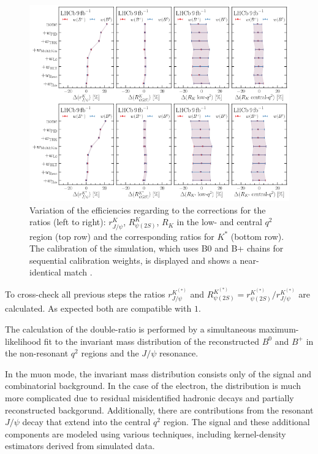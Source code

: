 \begin{figure}
    \centering
    \includegraphics[width=\linewidth]{figures/weights.png}
    \caption{Variation of the efficiencies regarding to the corrections for the ratios (left to right):
    $r^{K}_{J\!/\!\psi}$, $R^{K}_{\psi(2S)}$, $R_{K}$ in the low- and central $q^2$ region (top row) 
    and the corresponding ratios for $K^*$ (bottom row). The calibration of the simulation, which uses 
    B0 and B+ chains for sequential calibration weights, is displayed and shows a near-identical match 
    \cite{lhcbcollaboration2022test}.}
    \label{fig:weights}
\end{figure}
To cross-check all previous steps the ratios $r^{K^{(*)}}_{J\!/\!\psi}$ and 
${R^{K^{(*)}}_{\psi(2S)}=r^{K^{(*)}}_{\psi(2S)}/r^{K^{(*)}}_{J\!/\!\psi}}$ 
are calculated. As expected both are compatible with $\num{1}$.

The calculation of the double-ratio is performed by a simultaneous maximum-likelihood 
fit to the invariant mass distribution of the reconstructed $B^0$ and $B^+$ in the 
non-resonant $q^2$ regions and the $J\!/\!\psi$ resonance. 

In the muon mode, the invariant mass distribution consists only of the signal and 
combinatorial background. 
In the case of the electron, the distribution is much more complicated due to 
residual misidentified hadronic decays and partially reconstructed backgorund. 
Additionally, there are contributions from the resonant $J\!/\!\psi$ decay that extend 
into the central $q^2$ region. 
The signal and these additional components are modeled using various techniques, 
including kernel-density estimators derived from simulated data.

